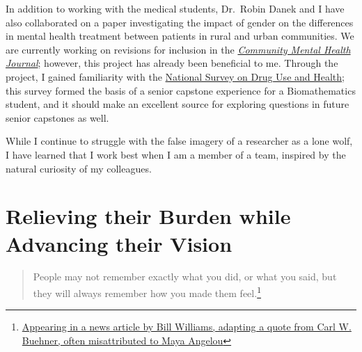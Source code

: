 \documentclass[
  letterpaper,
  DIV=11,
  numbers=noendperiod]{scrreprt}
\begin{document}
In addition to working with the medical students, Dr.~Robin Danek and I
have also collaborated on a paper investigating the impact of gender on
the differences in mental health treatment between patients in rural and
urban communities. We are currently working on revisions for inclusion
in the \href{https://link.springer.com/journal/10597}{\emph{Community
Mental Health Journal}}; however, this project has already been
beneficial to me. Through the project, I gained familiarity with the
\href{https://www.samhsa.gov/data/data-we-collect/nsduh-national-survey-drug-use-and-health}{National
Survey on Drug Use and Health}; this survey formed the basis of a senior
capstone experience for a Biomathematics student, and it should make an
excellent source for exploring questions in future senior capstones as
well.

\begin{tcolorbox}[enhanced jigsaw, coltitle=black, colframe=quarto-callout-tip-color-frame, opacityback=0, rightrule=.15mm, bottomrule=.15mm, leftrule=.75mm, bottomtitle=1mm, colbacktitle=quarto-callout-tip-color!10!white, breakable, titlerule=0mm, title=\textcolor{quarto-callout-tip-color}{\faLightbulb}\hspace{0.5em}{Operating as Part of a Team}, left=2mm, toptitle=1mm, toprule=.15mm, colback=white, arc=.35mm, opacitybacktitle=0.6]

While I continue to struggle with the false imagery of a researcher as a
lone wolf, I have learned that I work best when I am a member of a team,
inspired by the natural curiosity of my colleagues.

\end{tcolorbox}


\chapter{Relieving their Burden while Advancing their
Vision}\label{relieving-their-burden-while-advancing-their-vision}

\begin{quote}
People may not remember exactly what you did, or what you said, but they
will always remember how you made them feel.\footnote{\href{https://quoteinvestigator.com/2014/04/06/they-feel/?amp=1}{Appearing
  in a news article by Bill Williams, adapting a quote from Carl W.
  Buehner, often misattributed to Maya Angelou}}
\end{quote}
\end{document}
